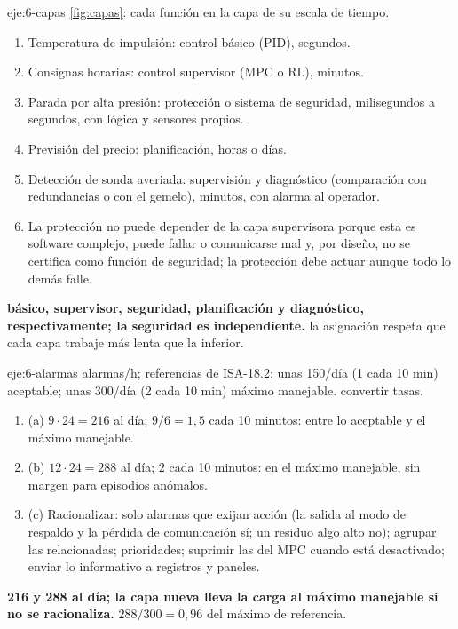\begin{solucion}{eje:6-capas}
\planteamiento \cref{fig:capas}: cada función en la capa de su escala de tiempo.
\pasos
\begin{enumerate}[label=\arabic*.]
  \item Temperatura de impulsión: control básico (PID), segundos.
  \item Consignas horarias: control supervisor (MPC o RL), minutos.
  \item Parada por alta presión: protección o sistema de seguridad, milisegundos a segundos, con lógica y sensores propios.
  \item Previsión del precio: planificación, horas o días.
  \item Detección de sonda averiada: supervisión y diagnóstico (comparación con redundancias o con el gemelo), minutos, con alarma al operador.
  \item La protección no puede depender de la capa supervisora porque esta es software complejo, puede fallar o comunicarse mal y, por diseño, no se certifica como función de seguridad; la protección debe actuar aunque todo lo demás falle.
\end{enumerate}
\resultado \textbf{básico, supervisor, seguridad, planificación y diagnóstico, respectivamente; la seguridad es independiente.}
\comprobacion la asignación respeta que cada capa trabaje más lenta que la inferior.
\end{solucion}

\begin{solucion}{eje:6-alarmas}
 alarmas/h; referencias de ISA-18.2: unas 150/día (1 cada 10 min) aceptable; unas 300/día (2 cada 10 min) máximo manejable.
\planteamiento convertir tasas.
\pasos
\begin{enumerate}[label=\arabic*.]
  \item (a) $9\cdot24=216$ al día; $9/6=1{,}5$ cada 10 minutos: entre lo aceptable y el máximo manejable.
  \item (b) $12\cdot24=288$ al día; $2$ cada 10 minutos: en el máximo manejable, sin margen para episodios anómalos.
  \item (c) Racionalizar: solo alarmas que exijan acción (la salida al modo de respaldo y la pérdida de comunicación sí; un residuo algo alto no); agrupar las relacionadas; prioridades; suprimir las del MPC cuando está desactivado; enviar lo informativo a registros y paneles.
\end{enumerate}
\resultado \textbf{216 y 288 al día; la capa nueva lleva la carga al máximo manejable si no se racionaliza.}
\comprobacion $288/300=0{,}96$ del máximo de referencia.
\end{solucion}


